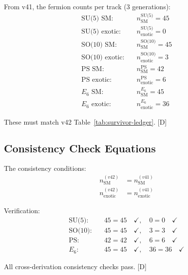 \documentclass[11pt,a4paper]{article}
\newcommand{\tagD}{\textcolor{blue!70!black}{[D]}}
\begin{document}
From v41, the fermion counts per track (3 generations):
\begin{align}
\label{eq:cross-su5-sm}
\text{SU(5) SM:} \quad & n_{\text{SM}}^{\text{SU(5)}} = 45 \\
\label{eq:cross-su5-exotic}
\text{SU(5) exotic:} \quad & n_{\text{exotic}}^{\text{SU(5)}} = 0 \\
\label{eq:cross-so10-sm}
\text{SO(10) SM:} \quad & n_{\text{SM}}^{\text{SO(10)}} = 45 \\
\label{eq:cross-so10-exotic}
\text{SO(10) exotic:} \quad & n_{\text{exotic}}^{\text{SO(10)}} = 3 \\
\label{eq:cross-ps-sm}
\text{PS SM:} \quad & n_{\text{SM}}^{\text{PS}} = 42 \\
\label{eq:cross-ps-exotic}
\text{PS exotic:} \quad & n_{\text{exotic}}^{\text{PS}} = 6 \\
\label{eq:cross-e6-sm}
\text{$E_6$ SM:} \quad & n_{\text{SM}}^{E_6} = 45 \\
\label{eq:cross-e6-exotic}
\text{$E_6$ exotic:} \quad & n_{\text{exotic}}^{E_6} = 36
\end{align}

These must match v42 Table~\ref{tab:survivor-ledger}. \tagD

\subsection{Consistency Check Equations}

The consistency conditions:
\begin{align}
\label{eq:consist-1}
n_{\text{SM}}^{(v42)} &= n_{\text{SM}}^{(v41)} \\
\label{eq:consist-2}
n_{\text{exotic}}^{(v42)} &= n_{\text{exotic}}^{(v41)}
\end{align}

Verification:
\begin{align}
\label{eq:verify-su5}
\text{SU(5):} \quad & 45 = 45 \quad \checkmark, \quad 0 = 0 \quad \checkmark \\
\label{eq:verify-so10}
\text{SO(10):} \quad & 45 = 45 \quad \checkmark, \quad 3 = 3 \quad \checkmark \\
\label{eq:verify-ps}
\text{PS:} \quad & 42 = 42 \quad \checkmark, \quad 6 = 6 \quad \checkmark \\
\label{eq:verify-e6}
E_6: \quad & 45 = 45 \quad \checkmark, \quad 36 = 36 \quad \checkmark
\end{align}

All cross-derivation consistency checks pass. \tagD
\end{document}
